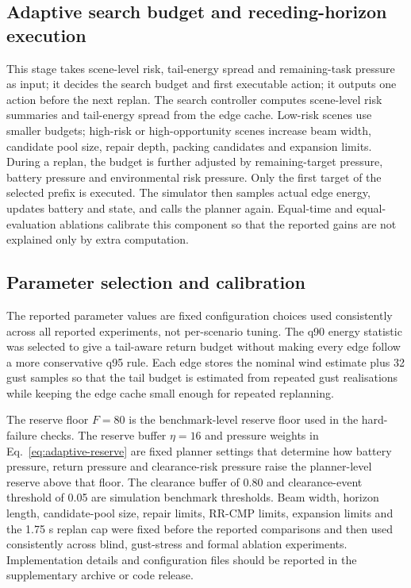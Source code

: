 \documentclass[preprint,12pt]{elsarticle}
\begin{document}
\subsection{Adaptive search budget and receding-horizon execution}

This stage takes scene-level risk, tail-energy spread and remaining-task pressure as input; it decides the search budget and first executable action; it outputs one action before the next replan. The search controller computes scene-level risk summaries and tail-energy spread from the edge cache. Low-risk scenes use smaller budgets; high-risk or high-opportunity scenes increase beam width, candidate pool size, repair depth, packing candidates and expansion limits. During a replan, the budget is further adjusted by remaining-target pressure, battery pressure and environmental risk pressure. Only the first target of the selected prefix is executed. The simulator then samples actual edge energy, updates battery and state, and calls the planner again. Equal-time and equal-evaluation ablations calibrate this component so that the reported gains are not explained only by extra computation.

\subsection{Parameter selection and calibration}

The reported parameter values are fixed configuration choices used consistently across all reported experiments, not per-scenario tuning. The q90 energy statistic was selected to give a tail-aware return budget without making every edge follow a more conservative q95 rule. Each edge stores the nominal wind estimate plus 32 gust samples so that the tail budget is estimated from repeated gust realisations while keeping the edge cache small enough for repeated replanning.

The reserve floor $F=80$ is the benchmark-level reserve floor used in the hard-failure checks. The reserve buffer $\eta=16$ and pressure weights in Eq.~\eqref{eq:adaptive-reserve} are fixed planner settings that determine how battery pressure, return pressure and clearance-risk pressure raise the planner-level reserve above that floor. The clearance buffer of 0.80 and clearance-event threshold of 0.05 are simulation benchmark thresholds. Beam width, horizon length, candidate-pool size, repair limits, RR-CMP limits, expansion limits and the 1.75 s replan cap were fixed before the reported comparisons and then used consistently across blind, gust-stress and formal ablation experiments. Implementation details and configuration files should be reported in the supplementary archive or code release.
\end{document}
